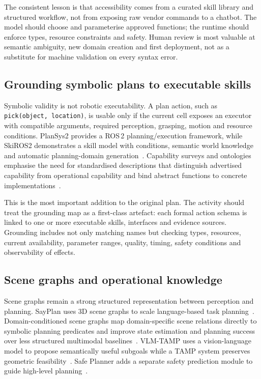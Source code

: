 \documentclass{plan4ari_report}
\begin{document}
The consistent lesson is that accessibility comes from a curated skill library and structured workflow, not from exposing raw vendor commands to a chatbot. The model should choose and parameterise approved functions; the runtime should enforce types, resource constraints and safety. Human review is most valuable at semantic ambiguity, new domain creation and first deployment, not as a substitute for machine validation on every syntax error.

\subsection{Grounding symbolic plans to executable skills}
Symbolic validity is not robotic executability. A plan action, such as \texttt{pick(object, location)}, is usable only if the current cell exposes an executor with compatible arguments, required perception, grasping, motion and resource conditions. PlanSys2 provides a ROS\,2 planning/execution framework, while SkiROS2 demonstrates a skill model with conditions, semantic world knowledge and automatic planning-domain generation~\cite{martin2021plansys2,micheli2025up,mayr2023skiros2}. Capability surveys and ontologies emphasise the need for standardised descriptions that distinguish advertised capability from operational capability and bind abstract functions to concrete implementations~\cite{pantano2022capability,zhangsprenger2024orpp,dasilva2024capontology,westermann2025automationml,profanter2019opcua,dasilva2023aas}.

This is the most important addition to the original \PlanARI{} plan. The activity should treat the grounding map as a first-class artefact: each formal action schema is linked to one or more executable skills, interfaces and evidence sources. Grounding includes not only matching names but checking types, resources, current availability, parameter ranges, quality, timing, safety conditions and observability of effects.

\subsection{Scene graphs and operational knowledge}
Scene graphs remain a strong structured representation between perception and planning. SayPlan uses 3D scene graphs to scale language-based task planning~\cite{rana2023sayplan}. Domain-conditioned scene graphs map domain-specific scene relations directly to symbolic planning predicates and improve state estimation and planning success over less structured multimodal baselines~\cite{herzog2025dcsg}. VLM-TAMP uses a vision-language model to propose semantically useful subgoals while a TAMP system preserves geometric feasibility~\cite{yang2025vlmtamp}. Safe Planner adds a separate safety prediction module to guide high-level planning~\cite{li2025safeplanner}.
\end{document}
